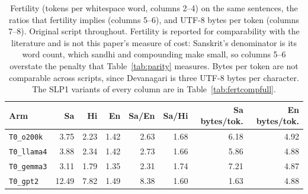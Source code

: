 \begin{table}[t]
\centering
\small
\begin{tabular}{lrrrrrrr}
\toprule
Arm & Sa & Hi & En & Sa/En & Sa/Hi & Sa bytes/tok. & En bytes/tok. \\
\midrule
\texttt{T0\_o200k} & 3.75 & 2.23 & 1.42 & 2.63 & 1.68 & 6.18 & 4.92 \\
\texttt{T0\_llama4} & 3.88 & 2.34 & 1.42 & 2.73 & 1.66 & 5.86 & 4.88 \\
\texttt{T0\_gemma3} & 3.11 & 1.79 & 1.35 & 2.31 & 1.74 & 7.21 & 4.87 \\
\texttt{T0\_gpt2} & 12.49 & 7.82 & 1.49 & 8.38 & 1.60 & 1.63 & 4.88 \\
\bottomrule
\end{tabular}
\caption{Fertility (tokens per whitespace word, columns 2--4) on the same sentences, the ratios that fertility implies (columns 5--6), and UTF-8 bytes per token (columns 7--8). Original script throughout. Fertility is reported for comparability with the literature and is not this paper's measure of cost: Sanskrit's denominator is its word count, which sandhi and compounding make small, so columns 5--6 overstate the penalty that Table~\ref{tab:parity} measures. Bytes per token are not comparable across scripts, since Devanagari is three UTF-8 bytes per character. The SLP1 variants of every column are in Table~\ref{tab:fertcompfull}.}
\label{tab:fertcomp}
\end{table}
